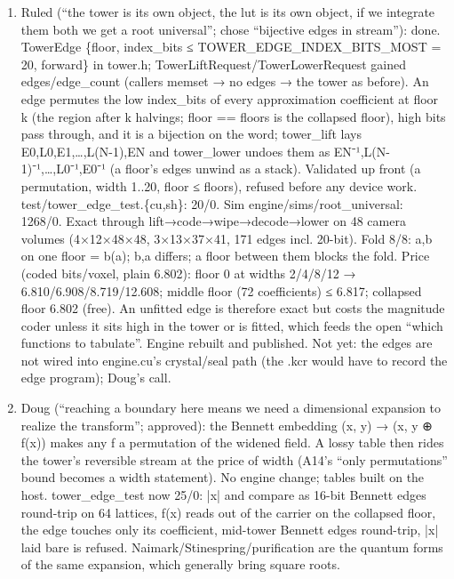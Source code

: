 \begin{enumerate}
\item Ruled (“the tower is its own object, the lut is its own object, if we integrate them both we get a root universal”; chose “bijective edges in stream”): done. TowerEdge \{floor, index\_\allowbreak{}bits ≤ TOWER\_\allowbreak{}EDGE\_\allowbreak{}INDEX\_\allowbreak{}BITS\_\allowbreak{}MOST = 20, forward\} in tower.h; TowerLiftRequest/TowerLowerRequest gained edges/edge\_\allowbreak{}count (callers memset → no edges → the tower as before). An edge permutes the low index\_\allowbreak{}bits of every approximation coefficient at floor k (the region after k halvings; floor == floors is the collapsed floor), high bits pass through, and it is a bijection on the word; tower\_\allowbreak{}lift lays E0,L0,E1,…,L(N-1),EN and tower\_\allowbreak{}lower undoes them as EN⁻¹,L(N-1)⁻¹,…,L0⁻¹,E0⁻¹ (a floor's edges unwind as a stack). Validated up front (a permutation, width 1..20, floor ≤ floors), refused before any device work. test/tower\_\allowbreak{}edge\_\allowbreak{}test.\{cu,sh\}: 20/0. Sim engine/sims/root\_\allowbreak{}universal: 1268/0. Exact through lift→code→wipe→decode→lower on 48 camera volumes (4×12×48×48, 3×13×37×41, 171 edges incl. 20-bit). Fold 8/8: a,b on one floor = b(a); b,a differs; a floor between them blocks the fold. Price (coded bits/voxel, plain 6.802): floor 0 at widths 2/4/8/12 → 6.810/6.908/8.719/12.608; middle floor (72 coefficients) ≤ 6.817; collapsed floor 6.802 (free). An unfitted edge is therefore exact but costs the magnitude coder unless it sits high in the tower or is fitted, which feeds the open “which functions to tabulate”. Engine rebuilt and published. Not yet: the edges are not wired into engine.cu's crystal/seal path (the .kcr would have to record the edge program); Doug's call.
\item Doug (“reaching a boundary here means we need a dimensional expansion to realize the transform”; approved): the Bennett embedding (x, y) → (x, y ⊕ f(x)) makes any f a permutation of the widened field. A lossy table then rides the tower's reversible stream at the price of width (A14's “only permutations” bound becomes a width statement). No engine change; tables built on the host. tower\_\allowbreak{}edge\_\allowbreak{}test now 25/0: |x| and compare as 16-bit Bennett edges round-trip on 64 lattices, f(x) reads out of the carrier on the collapsed floor, the edge touches only its coefficient, mid-tower Bennett edges round-trip, |x| laid bare is refused. Naimark/Stinespring/purification are the quantum forms of the same expansion, which generally bring square roots.

\end{enumerate}
